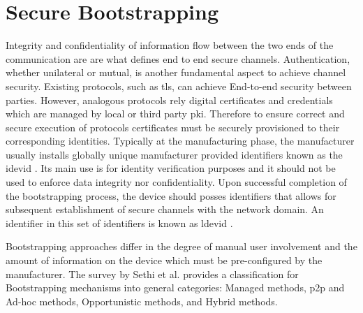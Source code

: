 \chapter{Secure Bootstrapping}
\label{ch:secureBootstrapping}

Integrity and confidentiality of information flow between the two ends of the communication are are what defines end to end secure channels. Authentication, whether unilateral or mutual, is another fundamental aspect to achieve channel security. Existing protocols, such as \gls{tls}, can achieve End-to-end security between parties. However, analogous protocols rely digital certificates and credentials which are managed by local or third party \gls{pki}. Therefore to ensure correct and secure execution of protocols certificates must be securely provisioned to their corresponding identities. Typically at the manufacturing phase, the manufacturer usually installs globally unique manufacturer provided identifiers known as the \gls{idevid} \cite{5367679}. Its main use is for identity verification purposes and it should not be used to enforce data integrity nor confidentiality. Upon successful completion of the bootstrapping process, the device should posses identifiers that allows for subsequent establishment of secure channels with the network domain. An identifier in this set of identifiers is known as \gls{ldevid} \cite{5367679}.
\par
Bootstrapping approaches differ in the degree of manual user involvement and the amount of information on the device which must be pre-configured by the manufacturer. The survey by Sethi et al. \cite{irtf-t2trg-secure-bootstrapping-00} provides a classification for Bootstrapping mechanisms into general categories: Managed methods, \gls{p2p} and Ad-hoc methods, Opportunistic methods, and Hybrid methods.
